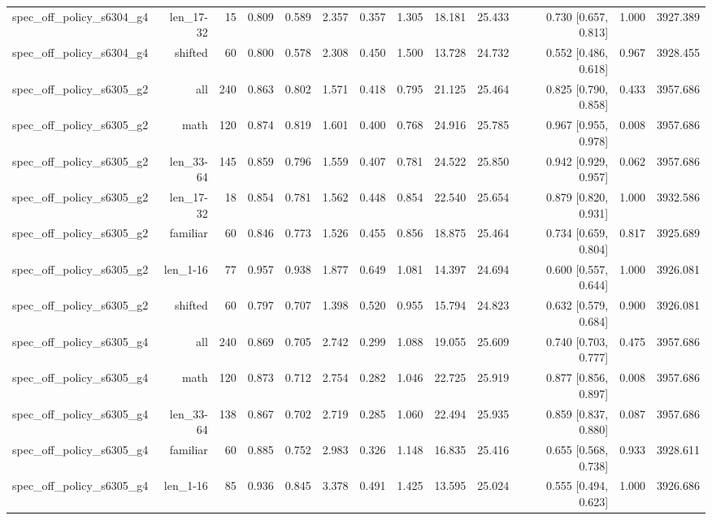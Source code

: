 \begin{tabular}{lrrrrrrrrrrrr}
spec\_off\_policy\_s6304\_g4 & len\_17-32 & 15 & 0.809 & 0.589 & 2.357 & 0.357 & 1.305 & 18.181 & 25.433 & 0.730 [0.657, 0.813] & 1.000 & 3927.389 \\
spec\_off\_policy\_s6304\_g4 & shifted & 60 & 0.800 & 0.578 & 2.308 & 0.450 & 1.500 & 13.728 & 24.732 & 0.552 [0.486, 0.618] & 0.967 & 3928.455 \\
spec\_off\_policy\_s6305\_g2 & all & 240 & 0.863 & 0.802 & 1.571 & 0.418 & 0.795 & 21.125 & 25.464 & 0.825 [0.790, 0.858] & 0.433 & 3957.686 \\
spec\_off\_policy\_s6305\_g2 & math & 120 & 0.874 & 0.819 & 1.601 & 0.400 & 0.768 & 24.916 & 25.785 & 0.967 [0.955, 0.978] & 0.008 & 3957.686 \\
spec\_off\_policy\_s6305\_g2 & len\_33-64 & 145 & 0.859 & 0.796 & 1.559 & 0.407 & 0.781 & 24.522 & 25.850 & 0.942 [0.929, 0.957] & 0.062 & 3957.686 \\
spec\_off\_policy\_s6305\_g2 & len\_17-32 & 18 & 0.854 & 0.781 & 1.562 & 0.448 & 0.854 & 22.540 & 25.654 & 0.879 [0.820, 0.931] & 1.000 & 3932.586 \\
spec\_off\_policy\_s6305\_g2 & familiar & 60 & 0.846 & 0.773 & 1.526 & 0.455 & 0.856 & 18.875 & 25.464 & 0.734 [0.659, 0.804] & 0.817 & 3925.689 \\
spec\_off\_policy\_s6305\_g2 & len\_1-16 & 77 & 0.957 & 0.938 & 1.877 & 0.649 & 1.081 & 14.397 & 24.694 & 0.600 [0.557, 0.644] & 1.000 & 3926.081 \\
spec\_off\_policy\_s6305\_g2 & shifted & 60 & 0.797 & 0.707 & 1.398 & 0.520 & 0.955 & 15.794 & 24.823 & 0.632 [0.579, 0.684] & 0.900 & 3926.081 \\
spec\_off\_policy\_s6305\_g4 & all & 240 & 0.869 & 0.705 & 2.742 & 0.299 & 1.088 & 19.055 & 25.609 & 0.740 [0.703, 0.777] & 0.475 & 3957.686 \\
spec\_off\_policy\_s6305\_g4 & math & 120 & 0.873 & 0.712 & 2.754 & 0.282 & 1.046 & 22.725 & 25.919 & 0.877 [0.856, 0.897] & 0.008 & 3957.686 \\
spec\_off\_policy\_s6305\_g4 & len\_33-64 & 138 & 0.867 & 0.702 & 2.719 & 0.285 & 1.060 & 22.494 & 25.935 & 0.859 [0.837, 0.880] & 0.087 & 3957.686 \\
spec\_off\_policy\_s6305\_g4 & familiar & 60 & 0.885 & 0.752 & 2.983 & 0.326 & 1.148 & 16.835 & 25.416 & 0.655 [0.568, 0.738] & 0.933 & 3928.611 \\
spec\_off\_policy\_s6305\_g4 & len\_1-16 & 85 & 0.936 & 0.845 & 3.378 & 0.491 & 1.425 & 13.595 & 25.024 & 0.555 [0.494, 0.623] & 1.000 & 3926.686 \\

\end{tabular}
